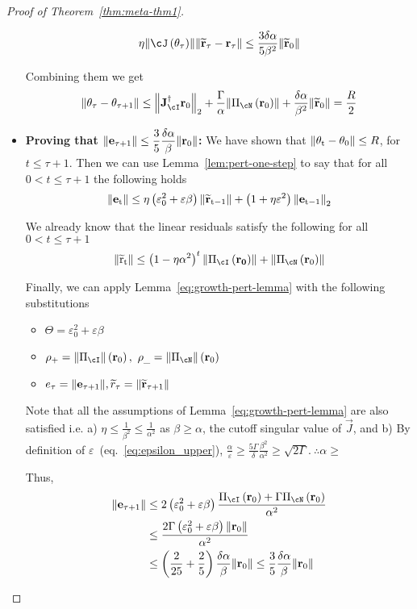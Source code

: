 \documentclass[a4paper]{article}
\let\temp\epsilon
\let\epsilon\varepsilon
\let\varepsilon\temp
\begin{document}
\begin{proof}[Proof of Theorem~\ref{thm:meta-thm1}]
\begin{itemize}
    \[\eta\norm{\cJ\br{\theta_\tau}}\norm{\widetilde{\vec{r}}_\tau
        - \vec{r}_\tau} \le
      \dfrac{3\delta\alpha}{5\beta^2}\norm{\widetilde{\vec{r}}_0}\]
    
    Combining them we get
    \[ \norm{\theta_\tau - \theta_{\tau+1}} \le
       \norm{\vec{J}_\cI^\dagger
        \vec{r}_0}_2 +
      \frac{\Gamma}{\alpha}\norm{\Pi_\cN\br{\vec{r}_0}}  +
      \dfrac{\delta\alpha}{\beta^2}\norm{\widetilde{\vec{r}}_0} =
      \dfrac{R}{2} \]
  \item \textbf{Proving that $\mathrm{\left\lVert{\mathbf{e}}_{\tau+1}\right\rVert}\le \dfrac{3}{5}\dfrac{\delta\alpha}{\beta}\mathrm{\left\lVert{\mathbf{r}}_0\right\rVert}$:}
    We have shown  that $\mathrm{\left\lVert\theta_t - \theta_0\right\rVert}\le R$, for
    $t\le \tau+1$. Then we can
    use Lemma~\ref{lem:pert-one-step} to say that for all
    $0< t\le \tau+1$ the following holds
    \[\norm{\vec{e}_t}\le \eta\br{\epsilon_0^2 +
        \epsilon\beta}\norm{\widetilde{\vec{r}}_{t-1}} +
      \br{1+\eta\epsilon^2}\norm{\vec{e}_{t-1}}_2\]

    We already know that the linear residuals satisfy the following
    for all $0<t\le \tau+1$
    \[ \norm{\widetilde{r}_t} \le \br{1 -
        \eta\alpha^2}^t\norm{\Pi_\cI\br{\vec{r_0}} } +
      \norm{\Pi_\cN\br{\vec{r}_0}}\]

    Finally, we can apply Lemma~\ref{eq:growth-pert-lemma} with the
    following substitutions

    \begin{itemize}
    \item $\Theta = \epsilon_0^2 + \epsilon\beta$
    \item $\rho_+ = \norm{\Pi_\cI}\br{\vec{r}_0},$\quad
      $\rho_{\_} = \norm{\Pi_\cN}\br{\vec{r}_0}$
    \item $e_\tau =
      \mathrm{\left\lVert{\mathbf{e}}_{\tau+1}\right\rVert},$\quad$\widetilde{r}_\tau =
      \mathrm{\left\lVert\widetilde{{\mathbf{r}}}_{\tau+1}\right\rVert}$
    \end{itemize}
    Note that all the assumptions of Lemma~\ref{eq:growth-pert-lemma}
    are also satisfied i.e. a)
    $\eta\le\frac{1}{\beta^2}\le\frac{1}{\alpha^2}$ as
    $\beta\ge\alpha$, the cutoff singular value of $\vec{J}$, and b)
    By definition of $\epsilon$~(eq.~\ref{eq:epsilon_upper}),
    $\frac{\alpha}{\epsilon}\ge\frac{5\Gamma}{\delta}\frac{\beta^2}{\alpha^2}\ge\sqrt{2\Gamma}.~\therefore\alpha\ge$


    Thus,
    \begin{align*}
      \norm{\vec{e}_{\tau+1}}&\le 2\br{\epsilon_0^2
                           +\epsilon\beta}\dfrac{\Pi_\cI\br{\vec{r}_0} +
                           \Gamma\Pi_{\cN}\br{\vec{r}_0}}{\alpha^2}\\
                         &\le \dfrac{2\Gamma\br{\epsilon_0^2
                           +\epsilon\beta}\norm{\vec{r}_0}}{\alpha^2}\\
                         &\le
                           \br{\frac{2}{25}+\frac{2}{5}}\frac{\delta\alpha}{\beta}\norm{\vec{r}_0}\le \frac{3}{5}\frac{\delta\alpha}{\beta}\norm{\vec{r}_0}
    \end{align*}
  \end{itemize}


\end{proof}
\end{document}
